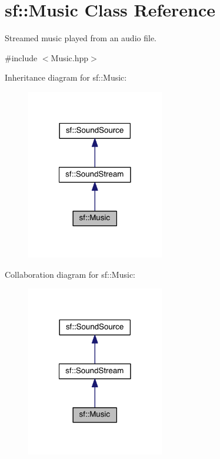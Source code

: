 \hypertarget{classsf_1_1_music}{\section{sf\-:\-:Music Class Reference}
\label{classsf_1_1_music}
}


Streamed music played from an audio file.  




{\ttfamily \#include $<$Music.\-hpp$>$}



Inheritance diagram for sf\-:\-:Music\-:
\nopagebreak
\begin{figure}[H]
\begin{center}
\leavevmode
\includegraphics[width=170pt]{classsf_1_1_music__inherit__graph}
\end{center}
\end{figure}


Collaboration diagram for sf\-:\-:Music\-:
\nopagebreak
\begin{figure}[H]
\begin{center}
\leavevmode
\includegraphics[width=170pt]{classsf_1_1_music__coll__graph}
\end{center}
\end{figure}
